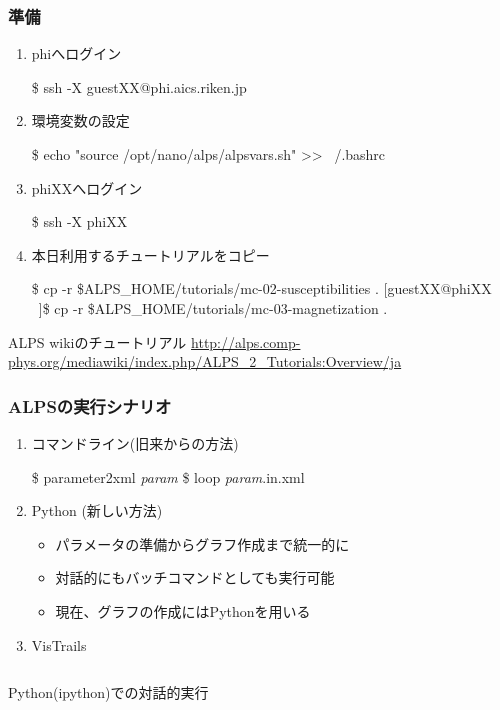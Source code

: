 \begin{frame}[fragile,shrink=10]
  \frametitle{準備}
  \begin{enumerate}
  \item<1-> phiへログイン
\begin{semiverbatim}
\$ ssh -X guestXX@phi.aics.riken.jp
\end{semiverbatim}
  \item<2-> 環境変数の設定
\begin{semiverbatim}
\$ echo "source /opt/nano/alps/alpsvars.sh" >> ~/.bashrc
\end{semiverbatim}
  \item<3-> phiXXへログイン
\begin{semiverbatim}
\$ ssh -X phiXX
\end{semiverbatim}
  \item<4-> 本日利用するチュートリアルをコピー
\begin{semiverbatim}
\$ cp -r \$ALPS\_HOME/tutorials/mc-02-susceptibilities .
[guestXX@phiXX ~]\$ cp -r \$ALPS\_HOME/tutorials/mc-03-magnetization .
\end{semiverbatim}
  \end{enumerate}
  \begin{alertblock}{ALPS wikiのチュートリアル}
    \url{http://alps.comp-phys.org/mediawiki/index.php/ALPS_2_Tutorials:Overview/ja}
  \end{alertblock}
\end{frame}

\begin{frame}[fragile]
  \frametitle{ALPSの実行シナリオ}
  \begin{enumerate}
  \item コマンドライン(旧来からの方法)
\begin{semiverbatim}
\$ parameter2xml \textit{param}
\$ loop \textit{param}.in.xml
\end{semiverbatim}
  \item Python (新しい方法)
    \begin{itemize}
    \item パラメータの準備からグラフ作成まで統一的に
    \item 対話的にもバッチコマンドとしても実行可能
    \item 現在、グラフの作成にはPythonを用いる
    \end{itemize}
  \item VisTrails
  \end{enumerate}
  \begin{columns}
    \begin{column}{.7\textwidth}
      \begin{center}
        \begin{alertblock}{}
          Python(ipython)での対話的実行
        \end{alertblock}
      \end{center}
    \end{column}
  \end{columns}
\end{frame}

